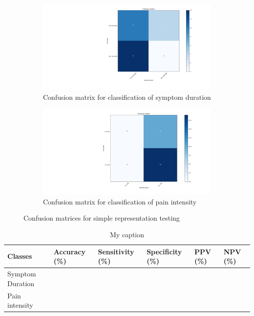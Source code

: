\documentclass[12pt,a4paper]{article}
\begin{document}
\begin{figure}[H]
  \begin{subfigure}[b]{0.45\textwidth}
    \includegraphics[width=\textwidth]{figures/sdura2cla}
    \caption{Confusion matrix for classification of symptom duration}
    \label{fig:f1}
  \end{subfigure}
  \hfill
  \begin{subfigure}[b]{0.45\textwidth}
    \includegraphics[width=\textwidth]{figures/spain2cla}
    \caption{Confusion matrix for classification of pain intensity}
    \label{fig:f2}
  \end{subfigure}
  \caption{Confusion matrices for simple representation testing}
\end{figure}


\begin{table}[H]
\centering
\begin{tabular}{|p{2cm}|p{2.2cm}|p{2.2cm}|p{2.2cm}|p{2cm}|p{2cm}|}
\hline
Classes          & Accuracy (\%) & Sensitivity (\%) & Specificity (\%) & PPV (\%) & NPV (\%) \\ \hline
Symptom Duration &                    &                      &                       &               &               \\ \hline
Pain intensity   &                    &                      &                       &               &               \\ \hline
\end{tabular}
\label{my-label}
\caption{My caption}
\end{table}
\end{document}
